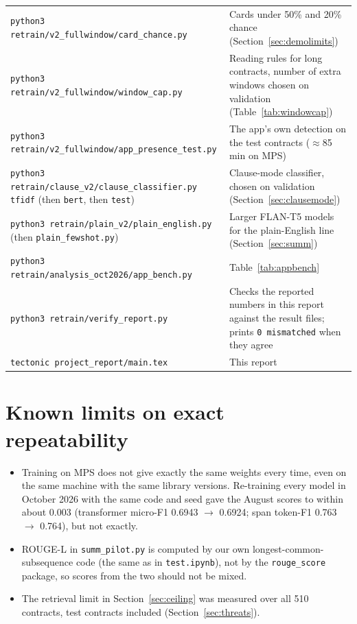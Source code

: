 {\begin{longtable}{>{\raggedright\arraybackslash}p{8.4cm} >{\raggedright\arraybackslash}p{5.6cm}}
\texttt{python3 retrain/v2\_fullwindow/\allowbreak card\_chance.py} & Cards under 50\% and 20\% chance (Section~\ref{sec:demolimits})\\
\texttt{python3 retrain/v2\_fullwindow/\allowbreak window\_cap.py} & Reading rules for long contracts, number of extra windows chosen on validation (Table~\ref{tab:windowcap})\\
\texttt{python3 retrain/v2\_fullwindow/\allowbreak app\_presence\_test.py} & The app's own detection on the test contracts ($\approx$85\,min on MPS)\\
\texttt{python3 retrain/clause\_v2/\allowbreak clause\_classifier.py tfidf} (then \texttt{bert}, then \texttt{test}) & Clause-mode classifier, chosen on validation (Section~\ref{sec:clausemode})\\
\texttt{python3 retrain/plain\_v2/\allowbreak plain\_english.py} (then \texttt{plain\_fewshot.py}) & Larger FLAN-T5 models for the plain-English line (Section~\ref{sec:summ})\\
\texttt{python3 retrain/analysis\_oct2026/\allowbreak app\_bench.py} & Table~\ref{tab:appbench}\\
\texttt{python3 retrain/verify\_report.py} & Checks the reported numbers in this report against the result files; prints \texttt{0 mismatched} when they agree\\
\texttt{tectonic project\_report/main.tex} & This report\\
\bottomrule
\end{longtable}
}

\section*{Known limits on exact repeatability}
\begin{itemize}[itemsep=2pt]
  \item Training on MPS does not give exactly the same weights every time, even on the same machine with the same library versions. Re-training every model in October 2026 with the same code and seed gave the August scores to within about 0.003 (transformer micro-F1 0.6943 $\rightarrow$ 0.6924; span token-F1 0.763 $\rightarrow$ 0.764), but not exactly.
  \item ROUGE-L in \texttt{summ\_pilot.py} is computed by our own longest-common-subsequence code (the same as in \texttt{test.ipynb}), not by the \texttt{rouge\_score} package, so scores from the two should not be mixed.
  \item The retrieval limit in Section~\ref{sec:ceiling} was measured over all 510 contracts, test contracts included (Section~\ref{sec:threats}).
\end{itemize}

